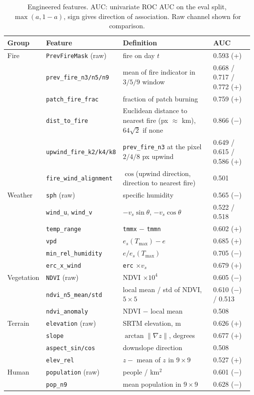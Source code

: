 \begin{table}[t]
\centering
\caption{Engineered features. AUC: univariate ROC AUC on the eval split, $\max(a, 1-a)$,
sign gives direction of association. Raw channel shown for comparison.}
\label{tab:features}
\begin{tabular}{llll}
\hline
Group & Feature & Definition & AUC \\
\hline
Fire & \texttt{PrevFireMask} (raw) & fire on day $t$ & 0.593 (+) \\
 & \texttt{prev\_fire\_n3/n5/n9} & mean of fire indicator in $3/5/9$ window & 0.668 / 0.717 / 0.772 (+) \\
 & \texttt{patch\_fire\_frac} & fraction of patch burning & 0.759 (+) \\
 & \texttt{dist\_to\_fire} & Euclidean distance to nearest fire (px $\approx$ km), $64\sqrt2$ if none & 0.866 ($-$) \\
 & \texttt{upwind\_fire\_k2/k4/k8} & \texttt{prev\_fire\_n3} at the pixel $2/4/8$ px upwind & 0.649 / 0.615 / 0.586 (+) \\
 & \texttt{fire\_wind\_alignment} & $\cos$(upwind direction, direction to nearest fire) & 0.501 \\
\hline
Weather & \texttt{sph} (raw) & specific humidity & 0.565 ($-$) \\
 & \texttt{wind\_u}, \texttt{wind\_v} & $-v_s\sin\theta$, $-v_s\cos\theta$ & 0.522 / 0.518 \\
 & \texttt{temp\_range} & \texttt{tmmx} $-$ \texttt{tmmn} & 0.602 (+) \\
 & \texttt{vpd} & $e_s(T_{\max}) - e$ & 0.685 (+) \\
 & \texttt{min\_rel\_humidity} & $e / e_s(T_{\max})$ & 0.705 ($-$) \\
 & \texttt{erc\_x\_wind} & \texttt{erc} $\times v_s$ & 0.679 (+) \\
\hline
Vegetation & \texttt{NDVI} (raw) & NDVI $\times10^4$ & 0.605 ($-$) \\
 & \texttt{ndvi\_n5\_mean/std} & local mean / std of NDVI, $5\times5$ & 0.610 ($-$) / 0.513 \\
 & \texttt{ndvi\_anomaly} & NDVI $-$ local mean & 0.508 \\
\hline
Terrain & \texttt{elevation} (raw) & SRTM elevation, m & 0.626 (+) \\
 & \texttt{slope} & $\arctan\lVert\nabla z\rVert$, degrees & 0.677 (+) \\
 & \texttt{aspect\_sin/cos} & downslope direction & 0.508 \\
 & \texttt{elev\_rel} & $z - $ mean of $z$ in $9\times9$ & 0.527 (+) \\
\hline
Human & \texttt{population} (raw) & people / km$^2$ & 0.601 ($-$) \\
 & \texttt{pop\_n9} & mean population in $9\times9$ & 0.628 ($-$) \\
\hline
\end{tabular}
\end{table}

